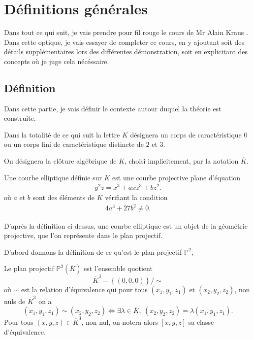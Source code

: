 \chapter{Définitions générales}
Dans tout ce qui suit, je vais prendre pour fil rouge le cours de Mr Alain Kraus \cite{KrausCE}. Dans cette optique, je vais essayer de completer ce cours,
en y ajoutant soit des détails supplémentaires lors des différentes démonstration, soit
en explicitant des concepts où je juge cela nécéssaire.

\section{Définition}
Dans cette partie, je vais définir le contexte autour duquel la théorie est construite.

Dans la totalité de ce qui suit la lettre $K$ désignera un corps de caractéristique $0$ ou un corps fini de caractéristique distincte de $2$ et $3$.

On désignera la clôture algébrique de $K$, choisi implicitement, par la notation $\overline{K}$.

\begin{definition}
    \label{def:ell}
    Une courbe elliptique définie sur $K$ est une courbe projective plane d'équation
    \begin{align}
        \label{eq:ell}
    y^2z=x^3+axz^3+bz^2
    .\end{align}
    où $a$ et $b$ sont des éléments de $K$ vérifiant la condition
    \begin{align}
        \label{eq:delta}
    4a^3+27b^2\neq 0
    .\end{align}
\end{definition}
D'aprés la définition ci-dessus, une courbe elliptique est un objet de la géométrie projective,
que l'on représente dans le plan projectif.

 D'abord donnons la définition de ce qu'est le plan projectif $\mathbb{P}^2$,
\begin{definition}
    Le plan projectif $\mathbb{P}^2(\overline{K})$ est l'ensemble quotient
    \[
    \overline{K}^3 - \left\{ (0,0,0) \right\} / \sim
    \] 
    où $\sim$ est la relation d'équivalence qui pour tous $(x_1,y_1,z_1)$ et
    $(x_2,y_2,z_2)$, non nuls de $\overline{K}^3$ on a
    \[
        (x_1,y_1,z_1) \sim (x_2,y_2,z_2) \iff \exists \lambda \in \overline{K},\
        (x_2,y_2,z_2)=\lambda(x_1,y_1,z_1)
    .\] 
    Pour tous $(x,y,z) \in \overline{K}^3$, non nul, on notera alors $\left[ x,y,z \right] $ sa
    classe d'équivalence.
\end{definition}


